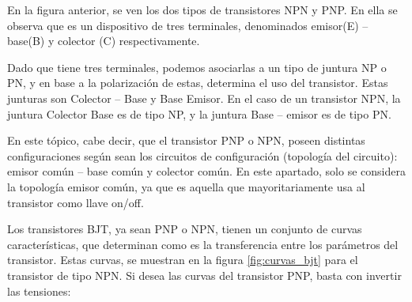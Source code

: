 En la figura anterior, se ven los dos tipos de transistores NPN y PNP. En ella se observa que es un dispositivo de tres terminales, denominados emisor(E) – base(B) y colector (C) respectivamente.  

Dado que tiene tres terminales, podemos asociarlas a un tipo de juntura NP o PN, y en base a la polarización de estas, determina el uso del transistor. Estas junturas son Colector – Base y Base Emisor. En el caso de un transistor NPN, la juntura Colector Base es de tipo NP, y la juntura Base – emisor es de tipo PN. 

En este tópico, cabe decir, que el transistor PNP o NPN, poseen distintas configuraciones según sean los circuitos de configuración (topología del circuito): emisor común – base común y colector común. En este apartado, solo se considera la topología emisor común, ya que es aquella que mayoritariamente usa al transistor como llave on/off.  

Los transistores BJT, ya sean PNP o NPN, tienen un conjunto de curvas características, que determinan como es la transferencia entre los parámetros del transistor. Estas curvas, se muestran en la figura \ref{fig:curvas_bjt} para el transistor de tipo NPN. Si desea las curvas del transistor PNP, basta con invertir las tensiones: 

